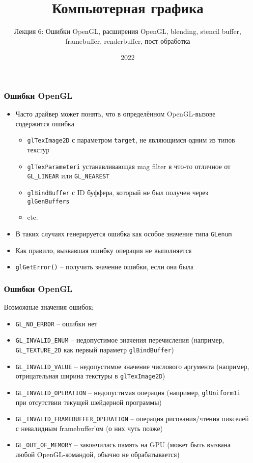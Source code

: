 \documentclass{beamer}
\title{Компьютерная графика}
\subtitle{Лекция 6: Ошибки OpenGL, расширения OpenGL, blending, stencil buffer, framebuffer, renderbuffer, пост-обработка}
\date{2022}
\begin{document}
\frame{\titlepage}

\begin{frame}[fragile]
\frametitle{Ошибки OpenGL}
\begin{itemize}
\item Часто драйвер может понять, что в определённом OpenGL-вызове содержится ошибка
\pause
\begin{itemize}
\item \verb|glTexImage2D| с параметром \verb|target|, не являющимся одним из типов текстур
\pause
\item \verb|glTexParameteri| устанавливающая mag filter в что-то отличное от \verb|GL_LINEAR| или \verb|GL_NEAREST|
\pause
\item \verb|glBindBuffer| с ID буффера, который не был получен через \verb|glGenBuffers|
\pause
\item etc.
\end{itemize}
\pause
\item В таких случаях генерируется ошибка как особое значение типа \verb|GLenum|
\pause
\item Как правило, вызвавшая ошибку операция не выполняется
\pause
\item \verb|glGetError()| -- получить значение ошибки, если она была
\end{itemize}
\end{frame}

\begin{frame}[fragile]
\frametitle{Ошибки OpenGL}
Возможные значения ошибок:
\begin{itemize}
\item \verb|GL_NO_ERROR| -- ошибки нет
\pause
\item \verb|GL_INVALID_ENUM| -- недопустимое значения перечисления (например, \verb|GL_TEXTURE_2D| как первый параметр \verb|glBindBuffer|)
\pause
\item \verb|GL_INVALID_VALUE| -- недопустимое значение числового аргумента (например, отрицательная ширина текстуры в \verb|glTexImage2D|)
\pause
\item \verb|GL_INVALID_OPERATION| -- недопустимая операция (например, \verb|glUniform1i| при отсутствии текущей шейдерной программы)
\pause
\item \verb|GL_INVALID_FRAMEBUFFER_OPERATION| -- операция рисования/чтения пикселей с невалидным framebuffer'ом (о них чуть позже)
\pause
\item \verb|GL_OUT_OF_MEMORY| -- закончилась память на GPU (может быть вызвана любой OpenGL-командой, обычно не обрабатывается)
\end{itemize}
\end{frame}
\end{document}

